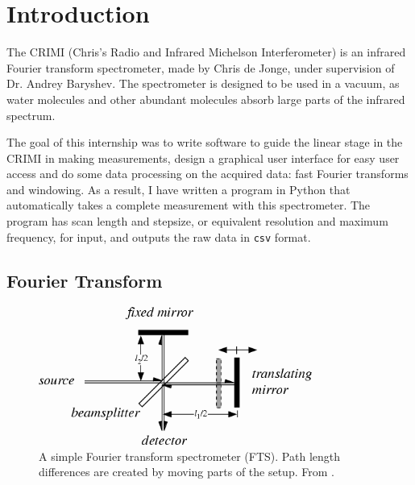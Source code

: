 
\section{Introduction}
The CRIMI (Chris's Radio and Infrared Michelson Interferometer) is an infrared Fourier transform spectrometer, made by Chris de Jonge, under supervision of Dr. Andrey Baryshev. The spectrometer is designed to be used in a vacuum, as water molecules and other abundant molecules absorb large parts of the infrared spectrum.

The goal of this internship was to write software to guide the linear stage in the CRIMI in making measurements, design a graphical user interface for easy user access and do some data processing on the acquired data: fast Fourier transforms and windowing. As a result, I have written a program in Python that automatically takes a complete measurement with this spectrometer. The program has scan length and stepsize, or equivalent resolution and maximum frequency, for input, and outputs the raw data in \verb!csv! format.


\subsection{Fourier Transform}

\begin{figure}
 \begin{center}
  \includegraphics[width=0.8\textwidth]{figures/fts.png}
  \caption{A simple Fourier transform spectrometer (FTS). Path length differences are created by moving parts of the setup.  From \cite{wolf}.}
  \label{fig:fts}
 \end{center}
\end{figure}

